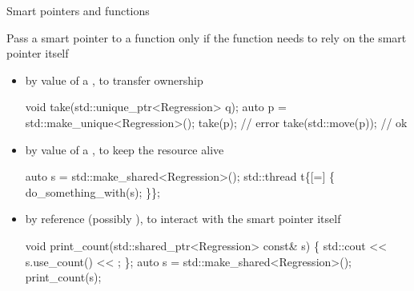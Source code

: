 \begin{frame}[fragile]{Smart pointers and functions}

  Pass a smart pointer to a function only if the function needs to rely on the
  smart pointer itself

  \begin{itemize}

  \item<2-> by value of a , to transfer ownership
    \begin{codeblock}
void take(std::unique_ptr<Regression> q);
auto p = std::make_unique<Regression>();
take(p);            // error
take(std::move(p)); // ok\end{codeblock}

\item<3-> by value of a , to keep the resource alive
  \begin{codeblock}
auto s = std::make_shared<Regression>();
std::thread t\{[=] \{ do_something_with(s); \}\};\end{codeblock}

\item<4-> by reference (possibly ), to interact with the smart
  pointer itself
  \begin{codeblock}
void print_count(std::shared_ptr<Regression> const& s) \{
  std::cout << s.use_count() << \bslashn{};
\};
auto s = std::make_shared<Regression>();
print_count(s);\end{codeblock}

  \end{itemize}

\end{frame}

